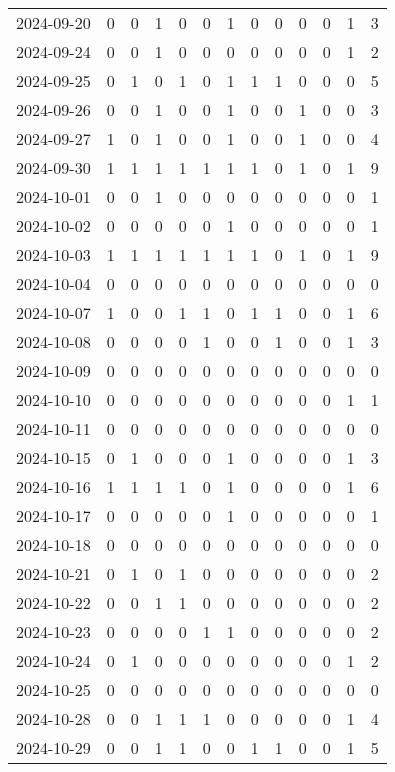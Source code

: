 \documentclass[dvipdfmx,oneside]{article}
\begin{document}
\begin{longtable}{lcccccccccccc}
2024-09-20 & 0 & 0 & 1 & 0 & 0 & 1 & 0 & 0 & 0 & 0 & 1 & 3 \\
2024-09-24 & 0 & 0 & 1 & 0 & 0 & 0 & 0 & 0 & 0 & 0 & 1 & 2 \\
2024-09-25 & 0 & 1 & 0 & 1 & 0 & 1 & 1 & 1 & 0 & 0 & 0 & 5 \\
2024-09-26 & 0 & 0 & 1 & 0 & 0 & 1 & 0 & 0 & 1 & 0 & 0 & 3 \\
2024-09-27 & 1 & 0 & 1 & 0 & 0 & 1 & 0 & 0 & 1 & 0 & 0 & 4 \\
2024-09-30 & 1 & 1 & 1 & 1 & 1 & 1 & 1 & 0 & 1 & 0 & 1 & 9 \\
2024-10-01 & 0 & 0 & 1 & 0 & 0 & 0 & 0 & 0 & 0 & 0 & 0 & 1 \\
2024-10-02 & 0 & 0 & 0 & 0 & 0 & 1 & 0 & 0 & 0 & 0 & 0 & 1 \\
2024-10-03 & 1 & 1 & 1 & 1 & 1 & 1 & 1 & 0 & 1 & 0 & 1 & 9 \\
2024-10-04 & 0 & 0 & 0 & 0 & 0 & 0 & 0 & 0 & 0 & 0 & 0 & 0 \\
2024-10-07 & 1 & 0 & 0 & 1 & 1 & 0 & 1 & 1 & 0 & 0 & 1 & 6 \\
2024-10-08 & 0 & 0 & 0 & 0 & 1 & 0 & 0 & 1 & 0 & 0 & 1 & 3 \\
2024-10-09 & 0 & 0 & 0 & 0 & 0 & 0 & 0 & 0 & 0 & 0 & 0 & 0 \\
2024-10-10 & 0 & 0 & 0 & 0 & 0 & 0 & 0 & 0 & 0 & 0 & 1 & 1 \\
2024-10-11 & 0 & 0 & 0 & 0 & 0 & 0 & 0 & 0 & 0 & 0 & 0 & 0 \\
2024-10-15 & 0 & 1 & 0 & 0 & 0 & 1 & 0 & 0 & 0 & 0 & 1 & 3 \\
2024-10-16 & 1 & 1 & 1 & 1 & 0 & 1 & 0 & 0 & 0 & 0 & 1 & 6 \\
2024-10-17 & 0 & 0 & 0 & 0 & 0 & 1 & 0 & 0 & 0 & 0 & 0 & 1 \\
2024-10-18 & 0 & 0 & 0 & 0 & 0 & 0 & 0 & 0 & 0 & 0 & 0 & 0 \\
2024-10-21 & 0 & 1 & 0 & 1 & 0 & 0 & 0 & 0 & 0 & 0 & 0 & 2 \\
2024-10-22 & 0 & 0 & 1 & 1 & 0 & 0 & 0 & 0 & 0 & 0 & 0 & 2 \\
2024-10-23 & 0 & 0 & 0 & 0 & 1 & 1 & 0 & 0 & 0 & 0 & 0 & 2 \\
2024-10-24 & 0 & 1 & 0 & 0 & 0 & 0 & 0 & 0 & 0 & 0 & 1 & 2 \\
2024-10-25 & 0 & 0 & 0 & 0 & 0 & 0 & 0 & 0 & 0 & 0 & 0 & 0 \\
2024-10-28 & 0 & 0 & 1 & 1 & 1 & 0 & 0 & 0 & 0 & 0 & 1 & 4 \\
2024-10-29 & 0 & 0 & 1 & 1 & 0 & 0 & 1 & 1 & 0 & 0 & 1 & 5 \\

\end{longtable}
\end{document}
